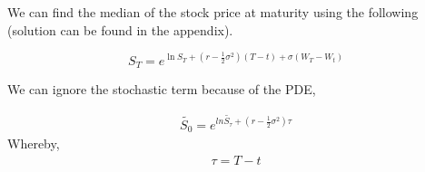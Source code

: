 \documentclass[12pt]{article}
\begin{document}
We can find the median of the stock price at maturity using the following (solution can be found in the appendix).

\begin{equation}
S_{T} = e^{\ln{S_{T}} + (r - \frac{1}{2}\sigma ^2)(T-t) + \sigma(W_{T} - W_{t})}
\end{equation}

We can ignore the stochastic term because of the PDE,

\begin{align*}
\tilde{S_{0}} = e^{ln{\tilde{S_{\tau}}} + (r-\frac{1}{2}\sigma ^2)\tau}
\end{align*}
Whereby,
\begin{align*}
\tau = T- t
\end{align*}

\end{document}
